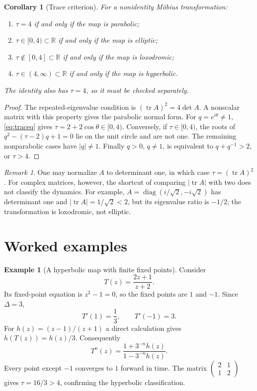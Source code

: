 \documentclass[11pt,a4paper]{article}
\newcommand{\R}{\mathbb{R}}
\newcommand{\abs}[1]{\left|#1\right|}
\DeclareMathOperator{\tr}{tr}
\theoremstyle{plain}
\newtheorem{corollary}[theorem]{Corollary}
\theoremstyle{definition}
\newtheorem{example}[theorem]{Example}
\theoremstyle{remark}
\newtheorem{remark}[theorem]{Remark}
\begin{document}
\begin{corollary}[Trace criterion]
For a nonidentity M\"obius transformation:
\begin{enumerate}
  \item $\tau=4$ if and only if the map is parabolic;
  \item $\tau\in[0,4)\subset\R$ if and only if the map is elliptic;
  \item $\tau\notin[0,4]\subset\R$ if and only if the map is loxodromic;
  \item $\tau\in(4,\infty)\subset\R$ if and only if the map is hyperbolic.
\end{enumerate}
The identity also has $\tau=4$, so it must be checked separately.
\end{corollary}

\begin{proof}
The repeated-eigenvalue condition is $(\tr A)^2=4\det A$.
A nonscalar matrix with this property gives the parabolic normal form.
For $q=e^{i\theta}\ne1$, \eqref{eq:traceq} gives
$\tau=2+2\cos\theta\in[0,4)$. Conversely, if $\tau\in[0,4)$,
the roots of $q^2-(\tau-2)q+1=0$ lie on the unit circle and are not one.
The remaining nonparabolic cases have $\abs{q}\ne1$.
Finally $q>0$, $q\ne1$, is equivalent to $q+q^{-1}>2$, or $\tau>4$.
\end{proof}

\begin{remark}
One may normalize $A$ to determinant one, in which case $\tau=(\tr A)^2$.
For complex matrices, however, the shortcut of comparing
$\abs{\tr A}$ with two does not classify the dynamics. For example,
$A=\operatorname{diag}(i/\sqrt{2},-i\sqrt{2})$ has determinant one and
$\abs{\tr A}=1/\sqrt{2}<2$, but its eigenvalue ratio is $-1/2$;
the transformation is loxodromic, not elliptic.
\end{remark}

\section{Worked examples}

\begin{example}[A hyperbolic map with finite fixed points]
Consider
\[
  T(z)=\frac{2z+1}{z+2}.
\]
Its fixed-point equation is $z^2-1=0$, so the fixed points are $1$ and
$-1$. Since $\Delta=3$,
\[
  T'(1)=\frac13,\qquad T'(-1)=3.
\]
For $h(z)=(z-1)/(z+1)$ a direct calculation gives
$h(T(z))=h(z)/3$. Consequently
\[
  T^n(z)=\frac{1+3^{-n}h(z)}{1-3^{-n}h(z)}.
\]
Every point except $-1$ converges to $1$ forward in time. The matrix
$\left(\begin{smallmatrix}2&1\\1&2\end{smallmatrix}\right)$ gives
$\tau=16/3>4$, confirming the hyperbolic classification.
\end{example}
\end{document}
